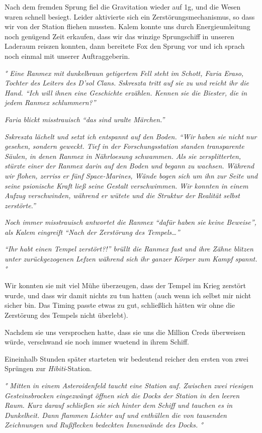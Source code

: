 \documentclass[11pt]{article}
\begin{document}
Nach dem fremden Sprung fiel die Gravitation wieder auf 1g, und die
Wesen waren schnell besiegt. Leider aktivierte sich ein
Zerstörungsmechanismus, so dass wir von der Station fliehen mussten.
Kalem konnte uns durch Energieumleitung noch genügend Zeit erkaufen,
dass wir das winzige Sprungschiff in unseren Laderaum reiszen konnten,
dann bereitete Fox den Sprung vor und ich sprach noch einmal mit unserer
Auftraggeberin.

\emph{° Eine Ranmex mit dunkelbraun getigertem Fell steht im Schott,
Faria Eraso, Tochter des Leiters des D'sol Clans. Sskreszta tritt auf
sie zu und reicht ihr die Hand. ``Ich will ihnen eine Geschichte
erzählen. Kennen sie die Biester, die in jedem Ranmex schlummern?''}

\emph{Faria blickt misstrauisch ``das sind uralte Märchen.''}

\emph{Sskreszta lächelt und setzt ich entspannt auf den Boden. ``Wir
haben sie nicht nur gesehen, sondern geweckt. Tief in der
Forschungsstation standen transparente Säulen, in denen Ranmex in
Nährloesung schwammen. Als sie zersplitterten, stürzte einer der Ranmex
darin auf den Boden und begann zu wachsen. Während wir flohen, zerriss
er fünf Space-Marines, Wände bogen sich um ihn zur Seite und seine
psionische Kraft ließ seine Gestalt verschwimmen. Wir konnten in einem
Aufzug verschwinden, während er wütete und die Struktur der Realität
selbst zerstörte.''}

\emph{Noch immer misstrauisch antwortet die Ranmex ``dafür haben sie
keine Beweise'', als Kalem eingreift ``Nach der Zerstörung des
Tempels\ldots{}''}

\emph{``Ihr habt einen Tempel zerstört?!'' brüllt die Ranmex fast und
ihre Zähne blitzen unter zurückgezogenen Lefzen während sich ihr ganzer
Körper zum Kampf spannt.°}

Wir konnten sie mit viel Mühe überzeugen, dass der Tempel im Krieg
zerstört wurde, und dass wir damit nichts zu tun hatten (auch wenn ich
selbst mir nicht sicher bin. Das Timing passte etwas zu gut, schließlich
hätten wir ohne die Zerstörung des Tempels nicht überlebt).

Nachdem sie uns versprochen hatte, dass sie uns die Million Creds
überweisen würde, verschwand sie noch immer wuetend in ihrem Schiff.

Eineinhalb Stunden später starteten wir bedeutend reicher den ersten von
zwei Sprüngen zur \emph{Hibiti}-Station.

\emph{° Mitten in einem Asteroidenfeld taucht eine Station auf. Zwischen
zwei riesigen Gesteinsbrocken eingezwängt öffnen sich die Docks der
Station in den leeren Raum. Kurz darauf schließen sie sich hinter dem
Schiff und tauchen es in Dunkelheit. Dann flammen Lichter auf und
enthüllen die von tausenden Zeichnungen und Rußflecken bedeckten
Innenwände des Docks. °}
\end{document}
